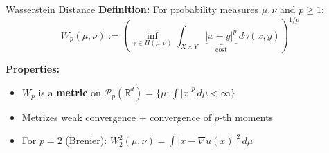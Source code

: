 \documentclass[aspectratio=169]{beamer}
\newcommand{\R}{\mathbb{R}}
\newcommand{\Pp}{\mathcal{P}_p}
\begin{document}
\begin{frame}{Wasserstein Distance}
\textbf{Definition:} For probability measures $\mu, \nu$ and $p \geq 1$:
\[
W_p(\mu, \nu) := \left( \inf_{\gamma \in \Pi(\mu,\nu)} \int_{X \times Y} \underbrace{|x-y|^p}_{\text{cost}} \, d\gamma(x,y) \right)^{1/p}
\]

\vspace{0.3cm}
\textbf{Properties:}
\begin{itemize}
    \item $W_p$ is a \textbf{metric} on $\Pp(\R^d) = \{\mu : \int |x|^p \, d\mu < \infty\}$
    \item Metrizes weak convergence + convergence of $p$-th moments
    \item For $p=2$ (Brenier): $W_2^2(\mu,\nu) = \int |x - \nabla u(x)|^2 \, d\mu$
\end{itemize}

\vspace{0.3cm}
\begin{center}
\end{center}
\end{frame}
\end{document}
